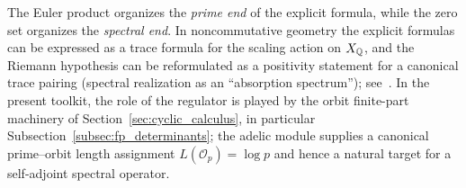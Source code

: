 \begin{remark}
The Euler product organizes the \emph{prime end} of the explicit formula, while the zero set organizes the \emph{spectral end}. In noncommutative geometry the explicit formulas can be expressed as a trace formula for the scaling action on $X_{\mathbb{Q}}$, and the Riemann hypothesis can be reformulated as a positivity statement for a canonical trace pairing (spectral realization as an ``absorption spectrum''); see~\cite{Connes1999}. In the present toolkit, the role of the regulator is played by the orbit finite-part machinery of Section~\ref{sec:cyclic_calculus}, in particular Subsection~\ref{subsec:fp_determinants}; the adelic module supplies a canonical prime--orbit length assignment $L(\mathcal{O}_p)=\log p$ and hence a natural target for a self-adjoint spectral operator.
\end{remark}

